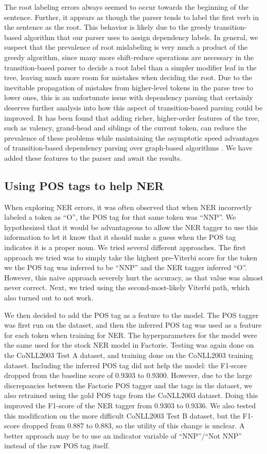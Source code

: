 \documentclass[12pt]{article}
\begin{document}
The root labeling errors always seemed to occur towards the beginning of the sentence. Further, it appears as though the parser tends to label the first verb in the sentence as the root. This behavior is likely due to the greedy transition-based algorithm that our parser uses to assign dependency labels. In general, we suspect that the prevalence of root mislabeling is very much a product of the greedy algorithm, since many more shift-reduce operations are necessary in the transition-based parser to decide a root label than a simpler modifier leaf in the tree, leaving much more room for mistakes when deciding the root. Due to the inevitable propagation of mistakes from higher-level tokens in the parse tree to lower ones, this is an unfortunate issue with dependency parsing that certainly deserves further analysis into how this aspect of transition-based parsing could be improved. It has been found that adding richer, higher-order features of the tree, such as valency, grand-head and siblings of the current token, can reduce the prevalence of these problems while maintaining the asymptotic speed advantages of transition-based dependency parsing over graph-based algorithms \cite{zhang-nivre-12}. We have added these features to the parser and await the results.

\subsection{Using POS tags to help NER}
When exploring NER errors, it was often observed that when NER incorrectly labeled a token as ``O'', the POS tag for that same token was ``NNP''. We hypothesized that it would be advantageous to allow the NER tagger to use this information to let it know that it should make a guess when the POS tag indicates it is a proper noun. We tried several different approaches. The first approach we tried was to simply take the highest pre-Viterbi score for the token we the POS tag was inferred to be ``NNP'' and the NER tagger inferred ``O''. However, this naive approach severely hurt the accuracy, as that value was almost never correct. Next, we tried using the second-most-likely Viterbi path, which also turned out to not work.

We then decided to add the POS tag as a feature to the model. The POS tagger was first run on the dataset, and then the inferred POS tag was used as a feature for each token when training for NER. The hyperparameters for the model were the same used for the stock NER model in Factorie. Testing was again done on the CoNLL2003 Test A dataset, and training done on the CoNLL2003 training dataset. Including the inferred POS tag did not help the model: the F1-score dropped from the baseline score of 0.9303 to 0.9300. However, due to the large discrepancies between the Factorie POS tagger and the tags in the dataset, we also retrained using the gold POS tags from the CoNLL2003 dataset. Doing this improved the F1-score of the NER tagger from 0.9303 to 0.9336. We also tested this modification on the more difficult CoNLL2003 Test B dataset, but the F1-score dropped from 0.887 to 0.883, so the utility of this change is unclear. A better approach may be to use an indicator variable of ``NNP''/``Not NNP'' instead of the raw POS tag itself.
\end{document}
